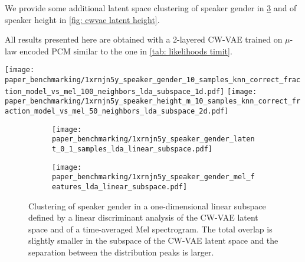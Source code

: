 {We provide some additional latent space clustering of speaker gender in \cref{fig: latent space visualization gender} and of speaker height in \cref{fig: cwvae latent height}.

All results presented here are obtained with a 2-layered CW-VAE trained on $\mu$-law encoded PCM similar to the one in \cref{tab: likelihoods timit}.

\begin{figure*}
    \centering
    \texttt{[image: paper\_benchmarking/1xrnjn5y\_speaker\_gender\_10\_samples\_knn\_correct\_fraction\_model\_vs\_mel\_100\_neighbors\_lda\_subspace\_1d.pdf]}
    \hfill
    \texttt{[image: paper\_benchmarking/1xrnjn5y\_speaker\_height\_m\_10\_samples\_knn\_correct\_fraction\_model\_vs\_mel\_50\_neighbors\_lda\_subspace\_2d.pdf]}
    \caption[Leave-one-out $k$-nearest-neighbour accuracy for speaker gender and height.]{
    Leave-one-out $k$-nearest-neighbor accuracy with different $k$ for
    (a) the speaker's gender and
    (b) the height of male speakers (female speakers yield a similar result).
    }
    \label{fig: knn fraction latent space height and gender}
\end{figure*}
\begin{figure}
     \centering
     \hfill
     \begin{subfigure}[b]{0.48\textwidth}
         \centering
         \texttt{[image: paper\_benchmarking/1xrnjn5y\_speaker\_gender\_latent\_0\_1\_samples\_lda\_linear\_subspace.pdf]}
         \caption{}
         \label{fig: latent space gender}
     \end{subfigure}
     \hfill
     \begin{subfigure}[b]{0.48\textwidth}
         \centering
         \texttt{[image: paper\_benchmarking/1xrnjn5y\_speaker\_gender\_mel\_features\_lda\_linear\_subspace.pdf]}
         \caption{}
         \label{fig: mel features gender}
     \end{subfigure}
    \caption[Clustering of speaker gender in 1D linear subspace of a CW-VAE latent space and a time-averaged Mel spectrogram.]{ Clustering of speaker gender in a one-dimensional linear subspace defined by a linear discriminant analysis of the CW-VAE latent space and of a time-averaged Mel spectrogram. The total overlap is slightly smaller in the subspace of the CW-VAE latent space and the separation between the distribution peaks is larger.}
    \label{fig: latent space visualization gender}
\end{figure}


}
